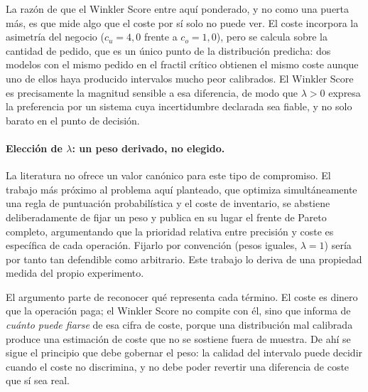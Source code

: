 La razón de que el Winkler Score entre aquí ponderado, y no como una puerta más, es que mide algo que el coste por sí solo no puede ver. El coste incorpora la asimetría del negocio ($c_u = 4{,}0$ frente a $c_o = 1{,}0$), pero se calcula sobre la cantidad de pedido, que es un único punto de la distribución predicha: dos modelos con el mismo pedido en el fractil crítico obtienen el mismo coste aunque uno de ellos haya producido intervalos mucho peor calibrados. El Winkler Score es precisamente la magnitud sensible a esa diferencia, de modo que $\lambda > 0$ expresa la preferencia por un sistema cuya incertidumbre declarada sea fiable, y no solo barato en el punto de decisión.

\paragraph{Elección de $\lambda$: un peso derivado, no elegido.} La literatura no ofrece un valor canónico para este tipo de compromiso. El trabajo más próximo al problema aquí planteado, que optimiza simultáneamente una regla de puntuación probabilística y el coste de inventario, se abstiene deliberadamente de fijar un peso y publica en su lugar el frente de Pareto completo, argumentando que la prioridad relativa entre precisión y coste es específica de cada operación. Fijarlo por convención (pesos iguales, $\lambda = 1$) sería por tanto tan defendible como arbitrario. Este trabajo lo deriva de una propiedad medida del propio experimento.

El argumento parte de reconocer qué representa cada término. El coste es dinero que la operación paga; el Winkler Score no compite con él, sino que informa de \emph{cuánto puede fiarse} de esa cifra de coste, porque una distribución mal calibrada produce una estimación de coste que no se sostiene fuera de muestra. De ahí se sigue el principio que debe gobernar el peso: la calidad del intervalo puede decidir cuando el coste no discrimina, y no debe poder revertir una diferencia de coste que sí sea real.

